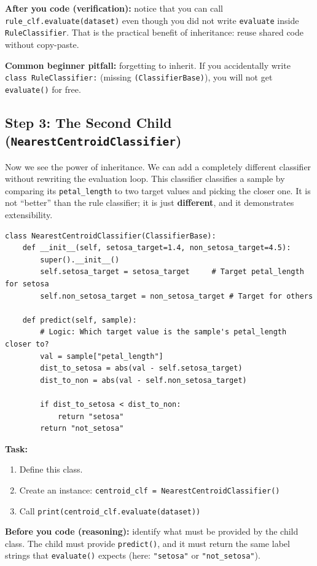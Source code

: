 \noindent
\textbf{After you code (verification):} notice that you can call \texttt{rule\_clf.evaluate(dataset)} even though you did not write \texttt{evaluate} inside \texttt{RuleClassifier}.
That is the practical benefit of inheritance: reuse shared code without copy-paste.

\noindent
\textbf{Common beginner pitfall:} forgetting to inherit.
If you accidentally write \texttt{class RuleClassifier:} (missing \texttt{(ClassifierBase)}), you will not get \texttt{evaluate()} for free.

\subsection{Step 3: The Second Child (\texttt{NearestCentroidClassifier})}
Now we see the power of inheritance. We can add a completely different classifier without rewriting the evaluation loop.
This classifier classifies a sample by comparing its \texttt{petal\_length} to two target values and picking the closer one.
It is not ``better'' than the rule classifier; it is just \textbf{different}, and it demonstrates extensibility.

\begin{verbatim}
class NearestCentroidClassifier(ClassifierBase):
    def __init__(self, setosa_target=1.4, non_setosa_target=4.5):
        super().__init__()
        self.setosa_target = setosa_target     # Target petal_length for setosa
        self.non_setosa_target = non_setosa_target # Target for others

    def predict(self, sample):
        # Logic: Which target value is the sample's petal_length closer to?
        val = sample["petal_length"]
        dist_to_setosa = abs(val - self.setosa_target)
        dist_to_non = abs(val - self.non_setosa_target)

        if dist_to_setosa < dist_to_non:
            return "setosa"
        return "not_setosa"
\end{verbatim}

\noindent
\textbf{Task:}
\begin{enumerate}
    \item Define this class.
    \item Create an instance: \texttt{centroid\_clf = NearestCentroidClassifier()}
    \item Call \texttt{print(centroid\_clf.evaluate(dataset))}
\end{enumerate}
\noindent
\textbf{Before you code (reasoning):} identify what must be provided by the child class.
The child must provide \texttt{predict()}, and it must return the same label strings that \texttt{evaluate()} expects (here: \texttt{"setosa"} or \texttt{"not\_setosa"}).

